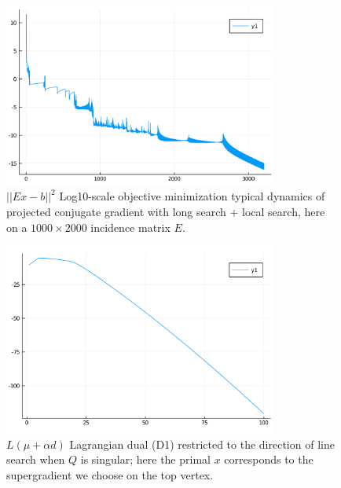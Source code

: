 \documentclass[10pt,twoside,book,a5paper]{ncc}
\begin{document}
\begin{figure}[ht]
\centering
\includegraphics[width=0.80\textwidth]{PCG}
\caption{$||E x - b||^2$ Log10-scale objective minimization typical dynamics of projected conjugate gradient with long search + local search, here on a $1000\times 2000$ incidence matrix $E$.}
\label{fig:PCG}
\end{figure}
\begin{figure}[ht]
\centering
\includegraphics[width=0.80\textwidth]{LineSearch}
\caption{$L(\mu+\alpha d)$ Lagrangian dual (D1) restricted to the direction of line search when $Q$ is singular; here the primal $x$ corresponds to the supergradient we choose on the top vertex.}
\label{fig:LineSearch}
\end{figure}

\end{document}
